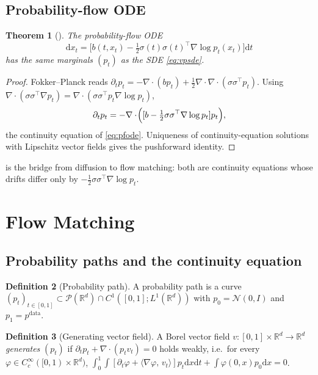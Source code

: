 \documentclass[11pt,letterpaper]{article}
\theoremstyle{plain}
\newtheorem{theorem}{Theorem}[section]
\theoremstyle{definition}
\newtheorem{definition}[theorem]{Definition}
\theoremstyle{remark}
\newcommand{\R}{\mathbb{R}}
\newcommand{\dd}{\mathrm{d}}
\newcommand{\calN}{\mathcal{N}}
\newcommand{\calP}{\mathcal{P}}
\newcommand{\grad}{\nabla}
\newcommand{\divg}{\nabla\cdot}
\newcommand{\inner}[2]{\langle #1,\,#2\rangle}
\begin{document}
\subsection{Probability-flow ODE}

\begin{theorem}[\citealt{song2021score}]\label{thm:pfode}
The probability-flow ODE
\begin{equation}
  \dd x_t=\bigl[b(t,x_t)-\tfrac12\sigma(t)\sigma(t)^\top\grad\log p_t(x_t)\bigr]\dd t
  \label{eq:pfode}
\end{equation}
has the same marginals $(p_t)$ as the SDE \eqref{eq:vpsde}.
\end{theorem}
\begin{proof}
Fokker--Planck reads $\partial_tp_t=-\divg(bp_t)+\tfrac12\divg\divg(\sigma\sigma^\top p_t)$.
Using $\divg(\sigma\sigma^\top\grad p_t)=\divg(\sigma\sigma^\top p_t\grad\log p_t)$,
\[
  \partial_tp_t=-\divg\!\Bigl([b-\tfrac12\sigma\sigma^\top\grad\log p_t]p_t\Bigr),
\]
the continuity equation of \eqref{eq:pfode}. Uniqueness of continuity-equation
solutions with Lipschitz vector fields \citep[Thm.~8.2.1]{ambrosio2008gradient}
gives the pushforward identity.
\end{proof}

 is the bridge from diffusion to flow matching: both are
continuity equations whose drifts differ only by $-\tfrac12\sigma\sigma^\top\grad\log p_t$.

\section{Flow Matching}\label{app:fm}

\subsection{Probability paths and the continuity equation}

\begin{definition}[Probability path]
A probability path is a curve $(p_t)_{t\in[0,1]}\subset\calP(\R^d)\cap
C^1([0,1];L^1(\R^d))$ with $p_0=\calN(0,I)$ and $p_1=p^{\mathrm{data}}$.
\end{definition}

\begin{definition}[Generating vector field]
A Borel vector field $v:[0,1]\times\R^d\to\R^d$ \emph{generates} $(p_t)$ if
$\partial_t p_t+\divg(p_t v_t)=0$
holds weakly, i.e.\ for every $\varphi\in C_c^\infty([0,1)\times\R^d)$,
$\int_0^1\!\int[\partial_t\varphi+\inner{\grad\varphi}{v_t}]p_t\dd x\dd t
+\int\varphi(0,x)p_0\dd x=0$.
\end{definition}
\end{document}
